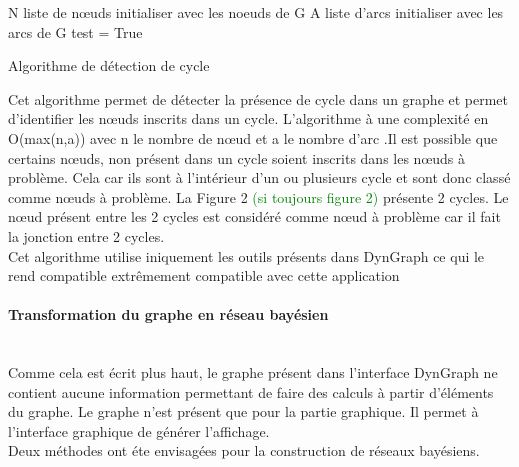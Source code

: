 \documentclass[conference]{IEEEtran}
\begin{document}
 \begin{algorithm}[H]
 N liste de nœuds initialiser avec les noeuds de G\;
 A liste d'arcs initialiser avec les arcs de G\;
 test = True\;
\caption{Algorithme de détection de cycle}
\end{algorithm}
\vspace{0.3cm}
Cet algorithme permet de détecter la présence de cycle dans un graphe et permet d'identifier les nœuds inscrits dans un cycle. L'algorithme à une complexité en O(max(n,a)) avec n le nombre de nœud et a le nombre d'arc .Il est possible que certains nœuds, non présent dans un cycle soient inscrits dans les nœuds à problème. Cela car ils sont à l'intérieur d'un ou plusieurs cycle et sont donc classé comme nœuds à problème. La Figure 2 \textcolor{green}{ (si toujours figure 2) } présente 2 cycles. Le nœud présent entre les 2 cycles est considéré comme nœud à problème car  il fait la jonction entre 2 cycles.\\
Cet algorithme utilise iniquement les outils présents dans DynGraph ce qui le rend compatible extrêmement compatible avec cette application\\

\paragraph{Transformation du graphe en réseau bayésien \hfill }
\\ Comme cela est écrit plus haut, le graphe présent dans l'interface DynGraph ne contient aucune information permettant de faire des calculs à partir d'éléments du graphe. Le graphe n'est présent que pour la partie graphique. Il permet à l'interface graphique de générer l'affichage.\\
Deux méthodes ont éte envisagées pour la construction de réseaux bayésiens. \\
\end{document}
